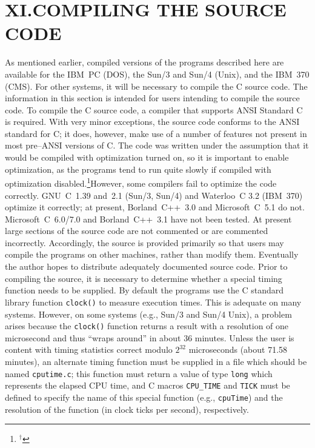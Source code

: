 \section{XI.\quad COMPILING THE SOURCE CODE}
%
As mentioned earlier, compiled versions of the programs described here are
available for the IBM~PC (DOS), the Sun/3 and Sun/4 (Unix), and the
IBM~370 (CMS).  For other systems, it will be necessary to compile the
C source code.  The information in this section is intended for users
intending to compile the source code.
\medbreak
To compile the C source code, a compiler that supports ANSI Standard C is
required.
With very minor exceptions, the source code conforms to the ANSI standard
for C; it does, however, make use of a number of features not present in
most pre--ANSI versions of C.  The code was written under the assumption
that it would be compiled with optimization turned on, so it is important
to enable optimization, as the programs tend to run quite slowly if
compiled with optimization disabled.\footnote{${}^{\dag}$}{\elevenpoint However, some compilers
fail to optimize the code correctly.  GNU~C~1.39 and~2.1 (Sun/3, Sun/4) and 
Waterloo~C 3.2 (IBM~370) optimize it correctly; at present, 
Borland~C++~3.0 and Microsoft~C~5.1 do not.  
Microsoft~C~6.0/7.0 and Borland~C++~3.1 have not been
tested.}  At present large sections of the source code
are not commented or are commented incorrectly.  Accordingly, the source
is provided primarily so that users may compile the programs on other
machines, rather than modify them.  Eventually the author hopes to
distribute adequately documented source code.
\medbreak
Prior to compiling the source, it is necessary to determine whether a
special timing function needs to be supplied.  By default the programs
use the C standard library function {\tt clock()} to measure execution
times.  This is adequate on many systems.  However, on some systems (e.g., 
Sun/3 and Sun/4 Unix), a problem arises because the {\tt clock()} function returns a 
result with a resolution of one microsecond and thus ``wraps around'' in about
36 minutes.  Unless the user is content with timing statistics correct modulo
$2^{32}$ microseconds (about 71.58 minutes), an alternate timing function
must be supplied in a file which should be named {\tt cputime.c}; 
this function must return a value of type {\tt long}
which represents the elapsed CPU time, and C macros 
{\tt CPU\_TIME} and {\tt TICK} must be
defined to specify the name of this special 
function (e.g., {\tt cpuTime}) and the resolution
of the function (in clock ticks per second), respectively.  
